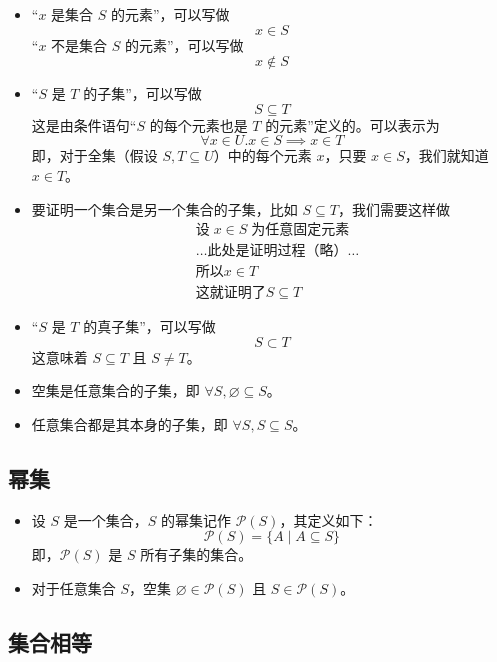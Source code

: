 \begin{itemize}
    \item ``$x$ 是集合 $S$ 的元素''，可以写做
        \[x \in S\]
        ``$x$ 不是集合 $S$ 的元素''，可以写做
        \[x \notin S\]
    \item ``$S$ 是 $T$ 的子集''，可以写做
        \[S \subseteq T\]
        这是由条件语句``$S$ 的每个元素也是 $T$ 的元素''定义的。可以表示为
        \[\forall x \in U . x \in S \implies x \in T\]
        即，对于全集（假设 $S,T \subseteq U$）中的每个元素 $x$，只要 $x \in S$，我们就知道 $x\in T$。
    \item 要证明一个集合是另一个集合的子集，比如 $S \subseteq T$，我们需要这样做
        \begin{align*}
            &\text{设}\; x \in S \;\text{为任意固定元素}\\
            &\dots \text{此处是证明过程（略）}\dots\\
            &\text{所以} x \in T\\
            &\text{这就证明了} S \subseteq T
        \end{align*}
    \item ``$S$ 是 $T$ 的真子集''，可以写做
        \[S \subset T\]
        这意味着 $S \subseteq T$ 且 $S \ne T$。
    \item 空集是任意集合的子集，即 $\forall S,\varnothing \subseteq S$。
    \item 任意集合都是其本身的子集，即 $\forall S, S \subseteq S$。
\end{itemize}

\subsection{幂集}

\begin{itemize}
    \item 设 $S$ 是一个集合，$S$ 的幂集记作 $\mathcal{P}(S)$，其定义如下：
        \[\mathcal{P}(S) = \{A \mid A \subseteq S\}\]
        即，$\mathcal{P}(S)$ 是 $S$ 所有子集的集合。
    \item 对于任意集合 $S$，空集 $\varnothing \in \mathcal{P}(S)$ 且  $S \in \mathcal{P}(S)$。
\end{itemize}

\subsection{集合相等}

